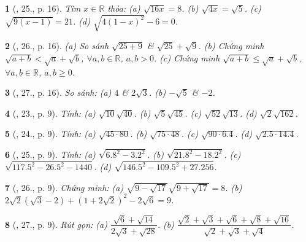 \documentclass{article}
\newtheorem{baitoan}{}%
\begin{document}
\begin{baitoan}[\cite{SGK_Toan_9_tap_1}, 25., p. 16]
	Tìm $x\in\mathbb{R}$ thỏa: (a) $\sqrt{16x} = 8$. (b) $\sqrt{4x} = \sqrt{5}$. (c) $\sqrt{9(x - 1)} = 21$. (d) $\sqrt{4(1 - x)^2} - 6 = 0$.
\end{baitoan}

\begin{baitoan}[\cite{SGK_Toan_9_tap_1}, 26., p. 16]
	(a) So sánh $\sqrt{25 + 9}$ \& $\sqrt{25} + \sqrt{9}$. (b) Chứng minh $\sqrt{a + b} < \sqrt{a} + \sqrt{b}$, $\forall a,b\in\mathbb{R}$, $a,b > 0$. (c) Chứng minh $\sqrt{a + b}\le\sqrt{a} + \sqrt{b}$, $\forall a,b\in\mathbb{R}$, $a,b\ge0$.
\end{baitoan}

\begin{baitoan}[\cite{SGK_Toan_9_tap_1}, 27., p. 16]
	So sánh: (a) $4$ \& $2\sqrt{3}$. (b) $-\sqrt{5}$ \& $-2$.
\end{baitoan}

\begin{baitoan}[\cite{SBT_Toan_9_tap_1}, 23., p. 9]
	Tính: (a) $\sqrt{10}\sqrt{40}$. (b) $\sqrt{5}\sqrt{45}$. (c) $\sqrt{52}\sqrt{13}$. (d) $\sqrt{2}\sqrt{162}$.
\end{baitoan}

\begin{baitoan}[\cite{SBT_Toan_9_tap_1}, 24., p. 9]
	Tính: (a) $\sqrt{45\cdot80}$. (b) $\sqrt{75\cdot48}$. (c) $\sqrt{90\cdot6.4}$. (d) $\sqrt{2.5\cdot14.4}$.
\end{baitoan}

\begin{baitoan}[\cite{SBT_Toan_9_tap_1}, 25., p. 9]
	Tính: (a) $\sqrt{6.8^2 - 3.2^2}$. (b) $\sqrt{21.8^2 - 18.2^2}$. (c) $\sqrt{117.5^2 - 26.5^2 - 1440}$.  (d) $\sqrt{146.5^2 - 109.5^2 + 27.256}$.
\end{baitoan}

\begin{baitoan}[\cite{SBT_Toan_9_tap_1}, 26., p. 9]
	Chứng minh: (a) $\sqrt{9 - \sqrt{17}}\sqrt{9 + \sqrt{17}} = 8$. (b) $2\sqrt{2}(\sqrt{3} - 2) + (1 + 2\sqrt{2})^2 - 2\sqrt{6} = 9$.
\end{baitoan}

\begin{baitoan}[\cite{SBT_Toan_9_tap_1}, 27., p. 9]
	Rút gọn: (a) $\dfrac{\sqrt{6} + \sqrt{14}}{2\sqrt{3} + \sqrt{28}}$. (b) $\dfrac{\sqrt{2} + \sqrt{3} + \sqrt{6} + \sqrt{8} + \sqrt{16}}{\sqrt{2} + \sqrt{3} + \sqrt{4}}$.
\end{baitoan}
\end{document}
